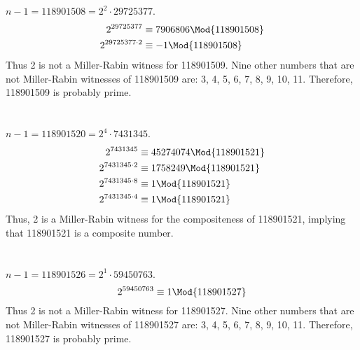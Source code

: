 \documentclass[
  coursecode={MTHE 418},
  assignmentname={Homework \homeworknumber},
  studentnumber=20053722,
  name={Bryan Hoang},
  draft,
]{
  ltxanswer%
}
\begin{document}
\begin{questions}
\begin{parts}
      \part{}
      \begin{solution}
        \(n - 1 = 118901508 = 2^{2} \cdot 29725377\).
        \begin{align*}
          2^{29725377}         &\equiv 7906806 \Mod{118901508} \\
          2^{29725377 \cdot 2} &\equiv -1 \Mod{118901508}
        \end{align*}
        Thus 2 is not a Miller-Rabin witness for 118901509. Nine other numbers that are not Miller-Rabin witnesses of 118901509 are: 3, 4, 5, 6, 7, 8, 9, 10, 11. Therefore, 118901509 is probably prime.
      \end{solution}

      \part{}
      \begin{solution}
        \(n - 1 = 118901520 = 2^{4} \cdot 7431345\).
        \begin{align*}
          2^{7431345}         &\equiv 45274074 \Mod{118901521} \\
          2^{7431345 \cdot 2} &\equiv 1758249 \Mod{118901521}  \\
          2^{7431345 \cdot 8} &\equiv 1 \Mod{118901521}        \\
          2^{7431345 \cdot 4} &\equiv 1 \Mod{118901521}        \\
        \end{align*}
        Thus, 2 is a Miller-Rabin witness for the compositeness of 118901521, implying that 118901521 is a composite number.
      \end{solution}

      \part{}
      \begin{solution}
        \(n - 1 = 118901526 = 2^{1} \cdot 59450763\).
        \begin{equation*}
          2^{59450763} \equiv 1 \Mod{118901527}
        \end{equation*}
        Thus 2 is not a Miller-Rabin witness for 118901527. Nine other numbers that are not Miller-Rabin witnesses of 118901527 are: 3, 4, 5, 6, 7, 8, 9, 10, 11. Therefore, 118901527 is probably prime.
      \end{solution}


\end{parts}
\end{questions}
\end{document}
